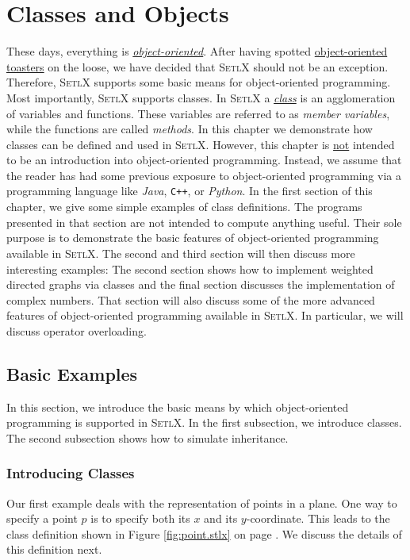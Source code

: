 \chapter{Classes and Objects}
These days, everything is
\href{http://en.wikipedia.org/wiki/Object-oriented_programming}{\emph{object-oriented}}.  
After having spotted
\href{http://www.danielsen.com/jokes/objecttoaster.txt}{object-oriented toasters}  
on the loose, we have decided that \textsc{SetlX} should not be an exception.  Therefore,
\textsc{SetlX} supports some basic means for object-oriented programming.  Most importantly,
\textsc{SetlX} supports classes.  In \textsc{SetlX} a  
\href{http://en.wikipedia.org/wiki/Class_(computer_programming)}{\emph{class}}
is an agglomeration of variables and functions.  These variables are referred to as 
\emph{member variables}, while the functions are called \emph{methods}.  
In this chapter we demonstrate how classes can be defined and used in \textsc{SetlX}.  
However, this chapter is \underline{not} intended to be an introduction into object-oriented
programming.  Instead,  we assume that the reader 
has had some previous exposure to object-oriented programming via a programming language like \textsl{Java},
\texttt{C++}, or \textsl{Python}.  In the first section of this chapter, we give some simple
examples of class definitions.  
The programs presented in that section are not intended to compute anything useful.  Their
sole purpose is to demonstrate the basic features of object-oriented programming available
in \textsc{SetlX}.  The second  and third section will then discuss more interesting examples:
The second section shows how to implement weighted directed graphs via classes and the final
section discusses the implementation of complex numbers.  That section will also discuss
some of the more advanced features of object-oriented programming available in
\textsc{SetlX}.  In particular, we will discuss operator overloading.

\section{Basic Examples}
In this section, we introduce the basic means by which object-oriented programming is supported in
\textsc{SetlX}.  In the first subsection, we introduce classes.  The second subsection shows how to
simulate inheritance.

\subsection{Introducing Classes}
Our first example deals with the representation of points in a plane.  One way to specify a point
$p$ is to specify both its $x$ and its $y$-coordinate.  This leads to the class definition shown in
Figure \ref{fig:point.stlx} on page \pageref{fig:point.stlx}.  We discuss the details of this
definition next.


